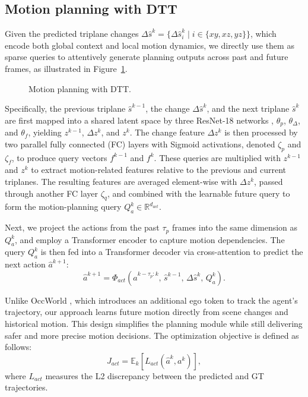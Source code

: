 \documentclass[11pt,a4paper]{article}
\begin{document}
\subsection{Motion planning with DTT}

Given the predicted triplane changes $\Delta\hat{s}^k = \{\Delta\hat{s}^k_i \mid i \in \{xy, xz, yz\}\}$, which encode both global context and local motion dynamics, we directly use them as sparse queries to attentively generate planning outputs across past and future frames, as illustrated in Figure~\ref{fig:planning}.

\begin{figure}[htbp]
  \centering
  \caption{Motion planning with DTT.}
  \label{fig:planning}
\end{figure}

Specifically, the previous triplane $\hat{s}^{k-1}$, the change $\Delta\hat{s}^k$, and the next triplane $\hat{s}^k$ are first mapped into a shared latent space by three ResNet-18 networks \cite{kaiminghe2016}, $\theta_p$, $\theta_\Delta$, and $\theta_f$, yielding $z^{k-1}$, $\Delta z^k$, and $z^k$.
The change feature $\Delta z^k$ is then processed by two parallel fully connected (FC) layers with Sigmoid activations, denoted $\zeta_p$ and $\zeta_f$, to produce query vectors $f^{k-1}$ and $f^k$.
These queries are multiplied with $z^{k-1}$ and $z^k$ to extract motion-related features relative to the previous and current triplanes.
The resulting features are averaged element-wise with $\Delta z^k$, passed through another FC layer $\zeta_q$, and combined with the learnable future query to form the motion-planning query $Q^k_a \in \mathbb{R}^{d_{act}}$.

Next, we project the actions from the past $\tau_p$ frames into the same dimension as $Q^k_a$, and employ a Transformer encoder to capture motion dependencies.
The query $Q^k_a$ is then fed into a Transformer decoder via cross-attention to predict the next action $\hat{a}^{k+1}$:
\begin{equation}
  \hat{a}^{k+1} = \Phi_{act}\!\left(\hat{a}^{k-\tau_p:k},\, \hat{s}^{k-1},\, \Delta\hat{s}^k,\, Q^k_a\right).
  \label{eq:act}
\end{equation}

Unlike OccWorld \cite{wenzhaozheng2024}, which introduces an additional ego token to track the agent's trajectory, our approach learns future motion directly from scene changes and historical motion.
This design simplifies the planning module while still delivering safer and more precise motion decisions.
The optimization objective is defined as follows:
\begin{equation}
  J_{act} = \mathbb{E}_k\!\left[ L_{act}(\hat{a}^k, a^k) \right],
  \label{eq:jact}
\end{equation}
where $L_{act}$ measures the L2 discrepancy between the predicted and GT trajectories.
\end{document}
